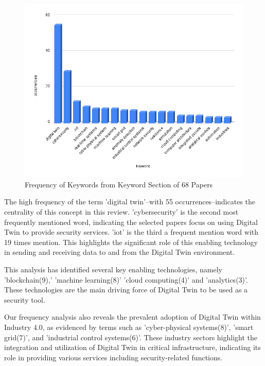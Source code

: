 \begin{figure}[H]
    \includegraphics[width=1\linewidth]{images/rt/keywordoccurence.png}
    \caption{Frequency of Keywords from Keyword Section of 68 Papers}
    \label{fig:alluvial-key}
\end{figure}


The high frequency of the term 'digital twin'--with 55 occurrences--indicates the centrality of this concept in this review. 'cybersecurity' is the second most frequently mentioned word, indicating the selected papers focus on using Digital Twin to provide security services. 'iot' is the third a frequent mention word with 19 times mention.   This highlights the significant role of this enabling technology in sending and receiving data to and from the Digital Twin environment. 

This analysis has identified several key enabling technologies, namely 'blockchain(9),' 'machine learning(8)' 'cloud computing(4)' and 'analytics(3)'. These technologies are the main driving force of Digital Twin to be used as a security tool. 

Our frequency analysis also reveals the prevalent adoption of Digital Twin within Industry 4.0, as evidenced by terms such as 'cyber-physical systems(8)', 'smart grid(7)', and 'industrial control systems(6)'. These industry sectors highlight the integration and utilization of Digital Twin in critical infrastructure, indicating its role in providing various services including security-related functions. 


